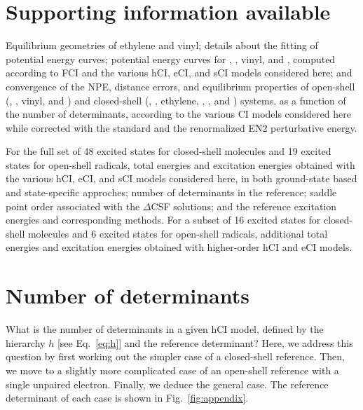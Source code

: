 \documentclass[aip,jcp,reprint,noshowkeys,superscriptaddress]{revtex4-1}
\begin{document}
\section*{Supporting information available}
\label{sec:SI}

Equilibrium geometries of ethylene and vinyl; details about the fitting of potential energy curves;
potential energy curves for , , vinyl, and ,
computed according to FCI and the various hCI, eCI, and sCI models considered here;
and convergence of the NPE, distance errors, and equilibrium properties of
open-shell (, , vinyl, and )
and closed-shell (, , ethylene, , , and ) systems,
as a function of the number of determinants, according to the various CI models considered here while
corrected with the standard and the renormalized EN2 perturbative energy.

For the full set of 48 excited states for closed-shell molecules and 19 excited states for open-shell radicals,
total energies and excitation energies obtained with
the various hCI, eCI, and sCI models considered here, in both ground-state based and state-specific approches;
number of determinants in the reference; saddle point order associated with the $\Delta$CSF solutions;
and the reference excitation energies and corresponding methods.
For a subset of 16 excited states for closed-shell molecules and 6 excited states for open-shell radicals,
additional total energies and excitation energies obtained with higher-order hCI and eCI models.



\appendix

\section{Number of determinants}
\label{sec:appendix}

What is the number of determinants in a given hCI model, defined by the hierarchy $h$ [see Eq.~\eqref{eq:h}] and the reference determinant?
Here, we address this question by first working out the simpler case of a closed-shell reference.
Then, we move to a slightly more complicated case of an open-shell reference with a single unpaired electron.
Finally, we deduce the general case.
The reference determinant of each case is shown in Fig.~\ref{fig:appendix}.
\end{document}
